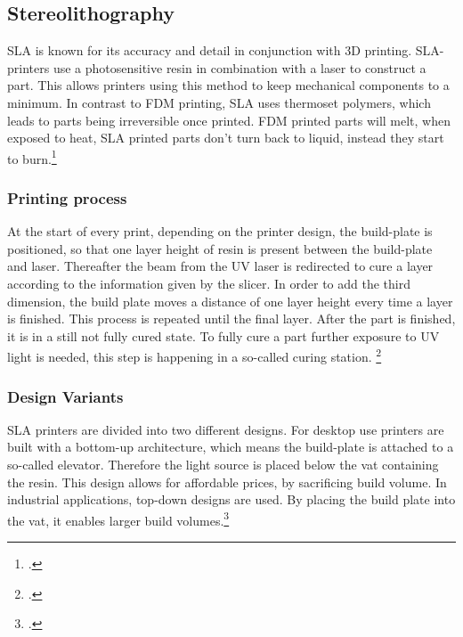 \subsection{Stereolithography}

SLA is known for its accuracy and detail in conjunction with 3D printing. SLA-printers use a photosensitive resin in combination with a laser to construct a part. This allows printers using this method to keep mechanical components to a minimum. In contrast to FDM printing, SLA uses thermoset polymers, which leads to parts being irreversible once printed. FDM printed parts will melt, when exposed to heat, SLA printed parts don't turn back to liquid, instead they start to burn.\footcite{hubsSLA3DPrintingNoDate}

\subsubsection{Printing process}

At the start of every print, depending on the printer design, the build-plate is positioned, so that one layer height of resin is present between the build-plate and laser. Thereafter the beam from the UV laser is redirected to cure a layer according to the information given by the slicer. In order to add the third dimension, the build plate moves a distance of one layer height every time a layer is finished. This process is repeated until the final layer.\newline
After the part is finished, it is in a still not fully cured state. To fully cure a part further exposure to UV light is needed, this step is happening in a so-called curing station. \footcite{hubsSLA3DPrintingNoDate} 

\subsubsection{Design Variants}

SLA printers are divided into two different designs. For desktop use printers are built with a bottom-up architecture, which means the build-plate is attached to a so-called elevator. Therefore the light source is placed below the vat containing the resin. This design allows for affordable prices, by sacrificing build volume.\newline
In industrial applications, top-down designs are used. By placing the build plate into the vat, it enables larger build volumes.\footcite{hubsSLA3DPrintingNoDate}

